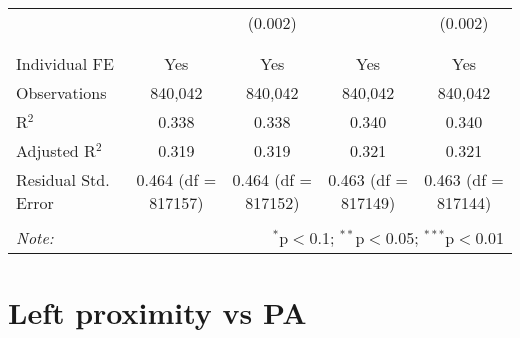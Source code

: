 \documentclass[
]{article}
\begin{document}
\begin{table}[!htbp]
{\begin{tabular}{@{\extracolsep{5pt}}lcccc}
  &  & (0.002) &  & (0.002) \\ 
  & & & & \\ 
\hline \\[-1.8ex] 
Individual FE & Yes & Yes & Yes & Yes \\ 
Observations & 840,042 & 840,042 & 840,042 & 840,042 \\ 
R$^{2}$ & 0.338 & 0.338 & 0.340 & 0.340 \\ 
Adjusted R$^{2}$ & 0.319 & 0.319 & 0.321 & 0.321 \\ 
Residual Std. Error & 0.464 (df = 817157) & 0.464 (df = 817152) & 0.463 (df = 817149) & 0.463 (df = 817144) \\ 
\hline 
\hline \\[-1.8ex] 
\textit{Note:}  & \multicolumn{4}{r}{$^{*}$p$<$0.1; $^{**}$p$<$0.05; $^{***}$p$<$0.01} \\ 
\end{tabular}
} 
\end{table} 
\newpage
\section{Left proximity vs PA}
\end{document}
